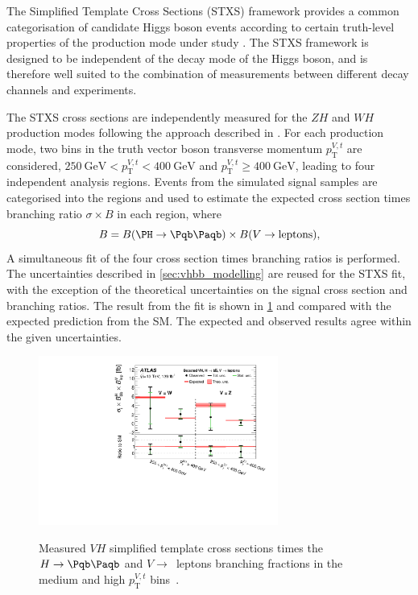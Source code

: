 The Simplified Template Cross Sections (STXS) framework provides a common categorisation of candidate Higgs boson events according to certain truth-level properties of the production mode under study \cite{deFlorian:2016spz,Badger:2016bpw}.
The STXS framework is designed to be independent of the decay mode of the Higgs boson, and is therefore well suited to the combination of measurements between different decay channels and experiments.

The STXS cross sections are independently measured for the $ZH$ and $WH$ production modes following the approach described in \cite{HIGG-2018-50}.
For each production mode, two bins in the truth vector boson transverse momentum $p_\textrm{T}^{V,t}$ are considered, $\SI{250}{\GeV} < p_\textrm{T}^{V,t} < \SI{400}{\GeV}$ and $p_\textrm{T}^{V,t} \geq \SI{400}{\GeV}$, leading to four independent analysis regions.
Events from the simulated signal samples are categorised into the regions and used to estimate the expected cross section times branching ratio $\sigma \times B$ in each region, where
%
\begin{equation}
  B =  B(\Hbb) \times B(V \rightarrow \text{leptons}),
\end{equation}
%
A simultaneous fit of the four cross section times branching ratios is performed.
The uncertainties described in \cref{sec:vhbb_modelling} are reused for the STXS fit, with the exception of the theoretical uncertainties on the signal cross section and branching ratios.
The result from the fit is shown in \cref{fig:STXSBinXSPlot} and compared with the expected prediction from the SM.
The expected and observed results agree within the given uncertainties.


\begin{figure}[!htbp]
  \centering
  \includegraphics[width=0.7\textwidth]{chapters/6.vhbb_boosted/figs/C_STXS_XS_Atlas.pdf}
  \label{fig:STXSBinXSPlot}
  \caption{
    Measured $VH$ simplified template cross sections times the $H \rightarrow \bbbar$ and $V \rightarrow$~leptons branching fractions in the medium and high $p_\textrm{T}^{V,t}$ bins~\cite{HIGG-2018-52}.
  }
\end{figure}


